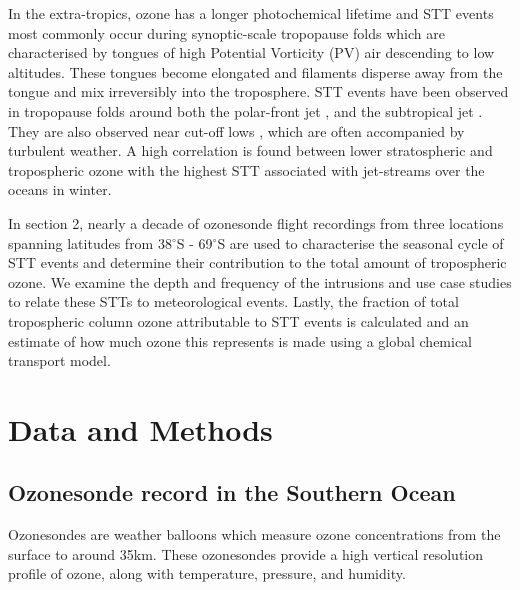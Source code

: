 \documentclass{article}
\begin{document}
    In the extra-tropics, ozone has a longer photochemical lifetime and STT events most commonly occur during synoptic-scale tropopause folds \citep{Sprenger2003, Tang2012} which are characterised by tongues of high Potential Vorticity (PV) air descending to low altitudes. These tongues become elongated and filaments disperse away from the tongue and mix irreversibly into the troposphere. STT events have been observed in tropopause folds around both the polar-front jet \citep{Vaughan1994, Beekmann1997}, and the subtropical jet \citep{Baray2000}. They are also observed near cut-off lows \citep{Price1993, Wirth1995}, which are often accompanied by turbulent weather. A high correlation is found between lower stratospheric and tropospheric ozone \citep{Terao2008} with the highest STT associated with jet-streams over the oceans in winter.
  


    In section 2, nearly a decade of ozonesonde flight recordings from three locations spanning latitudes from 38$^{\circ}$S - 69$^{\circ}$S are used to characterise the seasonal cycle of STT events and determine their contribution to the total amount of tropospheric ozone.
    We examine the depth and frequency of the intrusions and use case studies to relate these STTs to meteorological events.
    Lastly, the fraction of total tropospheric column ozone attributable to STT events is calculated and an estimate of how much ozone this represents is made using a global chemical transport model.

\section{Data and Methods}

  \subsection{Ozonesonde record in the Southern Ocean}
    Ozonesondes are weather balloons which measure ozone concentrations from the surface to around 35km.
    These ozonesondes provide a high vertical resolution profile of ozone, along with temperature, pressure, and humidity.
    
\end{document}

